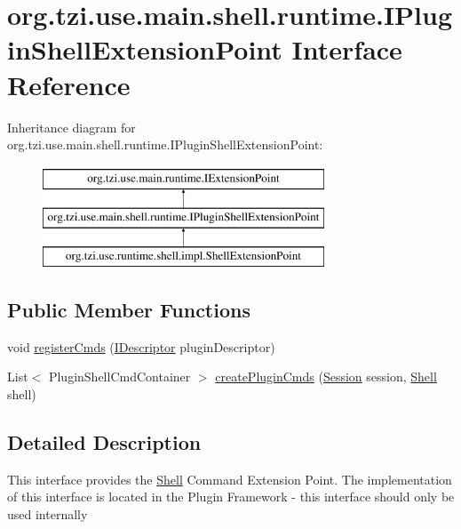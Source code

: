 \hypertarget{interfaceorg_1_1tzi_1_1use_1_1main_1_1shell_1_1runtime_1_1_i_plugin_shell_extension_point}{\section{org.\-tzi.\-use.\-main.\-shell.\-runtime.\-I\-Plugin\-Shell\-Extension\-Point Interface Reference}
\label{interfaceorg_1_1tzi_1_1use_1_1main_1_1shell_1_1runtime_1_1_i_plugin_shell_extension_point}
}
Inheritance diagram for org.\-tzi.\-use.\-main.\-shell.\-runtime.\-I\-Plugin\-Shell\-Extension\-Point\-:\begin{figure}[H]
\begin{center}
\leavevmode
\includegraphics[height=3.000000cm]{interfaceorg_1_1tzi_1_1use_1_1main_1_1shell_1_1runtime_1_1_i_plugin_shell_extension_point}
\end{center}
\end{figure}
\subsection*{Public Member Functions}
\begin{DoxyCompactItemize}
\item 
void \hyperlink{interfaceorg_1_1tzi_1_1use_1_1main_1_1shell_1_1runtime_1_1_i_plugin_shell_extension_point_aeed2f9e5ed3df83c67ca021c92994c31}{register\-Cmds} (\hyperlink{interfaceorg_1_1tzi_1_1use_1_1main_1_1runtime_1_1_i_descriptor}{I\-Descriptor} plugin\-Descriptor)
\item 
List$<$ Plugin\-Shell\-Cmd\-Container $>$ \hyperlink{interfaceorg_1_1tzi_1_1use_1_1main_1_1shell_1_1runtime_1_1_i_plugin_shell_extension_point_a1d6c421dab72c7f304e3f5ad35b2812d}{create\-Plugin\-Cmds} (\hyperlink{classorg_1_1tzi_1_1use_1_1main_1_1_session}{Session} session, \hyperlink{classorg_1_1tzi_1_1use_1_1main_1_1shell_1_1_shell}{Shell} shell)
\end{DoxyCompactItemize}


\subsection{Detailed Description}
This interface provides the \hyperlink{classorg_1_1tzi_1_1use_1_1main_1_1shell_1_1_shell}{Shell} Command Extension Point. The implementation of this interface is located in the Plugin Framework -\/ this interface should only be used internally

